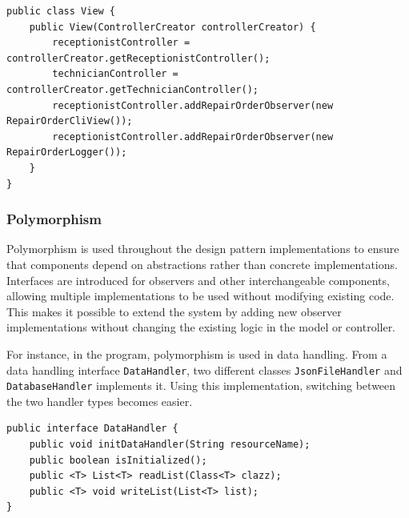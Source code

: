 \documentclass[a4paper]{scrartcl}
\begin{document}
\begin{lstlisting}[style=javastyle, caption={View registering observers on the controller}]
public class View {
    public View(ControllerCreator controllerCreator) {
        receptionistController = controllerCreator.getReceptionistController();
        technicianController = controllerCreator.getTechnicianController();
        receptionistController.addRepairOrderObserver(new RepairOrderCliView());
        receptionistController.addRepairOrderObserver(new RepairOrderLogger());
    }
}
\end{lstlisting}

\subsubsection{Polymorphism}

Polymorphism is used throughout the design pattern implementations to ensure that components depend on abstractions rather than concrete implementations. Interfaces are introduced for observers and other interchangeable components, allowing multiple implementations to be used without modifying existing code. This makes it possible to extend the system by adding new observer implementations without changing the existing logic in the model or controller.

For instance, in the program, polymorphism is used in data handling. From a data handling interface \texttt{DataHandler}, two different classes \texttt{JsonFileHandler} and \texttt{DatabaseHandler} implements it. Using this implementation, switching between the two handler types becomes easier. 


\begin{lstlisting}[style=javastyle, caption={DataHandler interface}]
public interface DataHandler {
    public void initDataHandler(String resourceName);
    public boolean isInitialized();
    public <T> List<T> readList(Class<T> clazz);
    public <T> void writeList(List<T> list);
}
\end{lstlisting}
\end{document}
